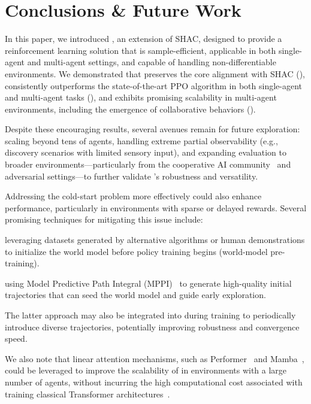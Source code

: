 
\section{Conclusions \& Future Work}\label{sect:conclusion}

In this paper, we introduced \fname{}, an extension of SHAC, designed to provide a reinforcement learning solution that is sample-efficient, applicable in both single-agent and multi-agent settings, and capable of handling non-differentiable environments. We demonstrated that \fname{} preserves the core alignment with SHAC (), consistently outperforms the state-of-the-art PPO algorithm in both single-agent and multi-agent tasks (), and exhibits promising scalability in multi-agent environments, including the emergence of collaborative behaviors ().

Despite these encouraging results, several avenues remain for future exploration: scaling beyond tens of agents, handling extreme partial observability (e.g., discovery scenarios with limited sensory input), and expanding evaluation to broader environments---particularly from the cooperative AI community~\cite{DBLP:journals/corr/abs-2211-13746} and adversarial settings—to further validate \fname{}'s robustness and versatility.

Addressing the cold-start problem more effectively could also enhance performance, particularly in environments with sparse or delayed rewards. Several promising techniques for mitigating this issue include:
\begin{enumerate*}[label=\emph{\roman*})]
    \item leveraging datasets generated by alternative algorithms or human demonstrations to initialize the world model before policy training begins (world-model pre-training).
    \item using Model Predictive Path Integral (MPPI)~\cite{Alvarez24}  to generate high-quality initial trajectories that can seed the world model and guide early exploration.
\end{enumerate*}
%
The latter approach may also be integrated into \fname{} during training to periodically introduce diverse trajectories, potentially improving robustness and convergence speed.

We also note that linear attention mechanisms, such as Performer~\cite{Choromanski20} and Mamba~\cite{Gu23}, could be leveraged to improve the scalability of \fname{} in environments with a large number of agents, without incurring the high computational cost associated with training classical Transformer architectures~\cite{Vaswani17}.

